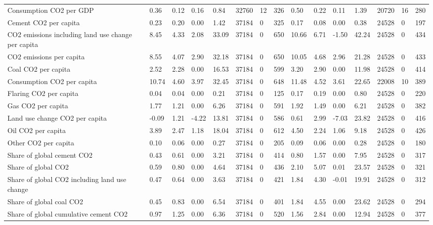 \begin{longtable}{lllllllllllllll}
Consumption CO2 per GDP & 0.36 & 0.12 & 0.16 & 0.84 & 32760 & 12 & 326 & 0.50 & 0.22 & 0.11 & 1.39 & 20720 & 16 & 280\\
\addlinespace
Cement CO2 per capita & 0.23 & 0.20 & 0.00 & 1.42 & 37184 & 0 & 325 & 0.17 & 0.08 & 0.00 & 0.38 & 24528 & 0 & 197\\
CO2 emissions including land use change per capita & 8.45 & 4.33 & 2.08 & 33.09 & 37184 & 0 & 650 & 10.66 & 6.71 & -1.50 & 42.24 & 24528 & 0 & 434\\
CO2 emissions per capita & 8.55 & 4.07 & 2.90 & 32.18 & 37184 & 0 & 650 & 10.05 & 4.68 & 2.96 & 21.28 & 24528 & 0 & 433\\
Coal CO2 per capita & 2.52 & 2.28 & 0.00 & 16.53 & 37184 & 0 & 599 & 3.20 & 2.90 & 0.00 & 11.98 & 24528 & 0 & 414\\
Consumption CO2 per capita & 10.74 & 4.60 & 3.97 & 32.45 & 37184 & 0 & 648 & 11.48 & 4.52 & 3.61 & 22.65 & 22008 & 10 & 389\\
\addlinespace
Flaring CO2 per capita & 0.04 & 0.04 & 0.00 & 0.21 & 37184 & 0 & 125 & 0.17 & 0.19 & 0.00 & 0.80 & 24528 & 0 & 220\\
Gas CO2 per capita & 1.77 & 1.21 & 0.00 & 6.26 & 37184 & 0 & 591 & 1.92 & 1.49 & 0.00 & 6.21 & 24528 & 0 & 382\\
Land use change CO2 per capita & -0.09 & 1.21 & -4.22 & 13.81 & 37184 & 0 & 586 & 0.61 & 2.99 & -7.03 & 23.82 & 24528 & 0 & 416\\
Oil CO2 per capita & 3.89 & 2.47 & 1.18 & 18.04 & 37184 & 0 & 612 & 4.50 & 2.24 & 1.06 & 9.18 & 24528 & 0 & 426\\
Other CO2 per capita & 0.10 & 0.06 & 0.00 & 0.27 & 37184 & 0 & 205 & 0.09 & 0.06 & 0.00 & 0.28 & 24528 & 0 & 180\\
\addlinespace
Share of global cement CO2 & 0.43 & 0.61 & 0.00 & 3.21 & 37184 & 0 & 414 & 0.80 & 1.57 & 0.00 & 7.95 & 24528 & 0 & 317\\
Share of global CO2 & 0.59 & 0.80 & 0.00 & 4.64 & 37184 & 0 & 436 & 2.10 & 5.07 & 0.01 & 23.57 & 24528 & 0 & 321\\
Share of global CO2 including land use change & 0.47 & 0.64 & 0.00 & 3.63 & 37184 & 0 & 421 & 1.84 & 4.30 & -0.01 & 19.91 & 24528 & 0 & 312\\
Share of global coal CO2 & 0.45 & 0.83 & 0.00 & 6.54 & 37184 & 0 & 401 & 1.84 & 4.55 & 0.00 & 23.62 & 24528 & 0 & 294\\
Share of global cumulative cement CO2 & 0.97 & 1.25 & 0.00 & 6.36 & 37184 & 0 & 520 & 1.56 & 2.84 & 0.00 & 12.94 & 24528 & 0 & 377\\

\end{longtable}

